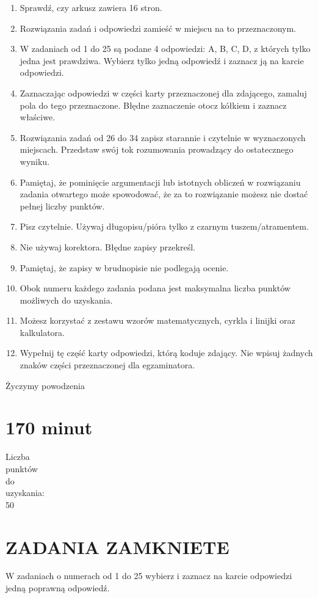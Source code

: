 \documentclass[10pt]{article}
\begin{document}
\begin{enumerate}
  \item Sprawdź, czy arkusz zawiera 16 stron.
  \item Rozwiązania zadań i odpowiedzi zamieść w miejscu na to przeznaczonym.
  \item W zadaniach od 1 do 25 są podane 4 odpowiedzi: A, B, C, D, z których tylko jedna jest prawdziwa. Wybierz tylko jedną odpowiedź i zaznacz ją na karcie odpowiedzi.
  \item Zaznaczając odpowiedzi w części karty przeznaczonej dla zdającego, zamaluj pola do tego przeznaczone. Błędne zaznaczenie otocz kółkiem i zaznacz właściwe.
  \item Rozwiązania zadań od 26 do 34 zapisz starannie i czytelnie w wyznaczonych miejscach. Przedstaw swój tok rozumowania prowadzący do ostatecznego wyniku.
  \item Pamiętaj, że pominięcie argumentacji lub istotnych obliczeń w rozwiązaniu zadania otwartego może spowodować, że za to rozwiązanie możesz nie dostać pełnej liczby punktów.
  \item Pisz czytelnie. Używaj długopisu/pióra tylko z czarnym tuszem/atramentem.
  \item Nie używaj korektora. Błędne zapisy przekreśl.
  \item Pamiętaj, że zapisy w brudnopisie nie podlegają ocenie.
  \item Obok numeru każdego zadania podana jest maksymalna liczba punktów możliwych do uzyskania.
  \item Możesz korzystać z zestawu wzorów matematycznych, cyrkla i linijki oraz kalkulatora.
  \item Wypełnij tę część karty odpowiedzi, którą koduje zdający. Nie wpisuj żadnych znaków części przeznaczonej dla egzaminatora.
\end{enumerate}

Życzymy powodzenia

\section*{170 minut}
Liczba\\
punktów\\
do\\
uzyskania:\\
50

\section*{ZADANIA ZAMKNIETE}
W zadaniach o numerach od 1 do 25 wybierz i zaznacz na karcie odpowiedzi jedną poprawną odpowiedź.
\end{document}
